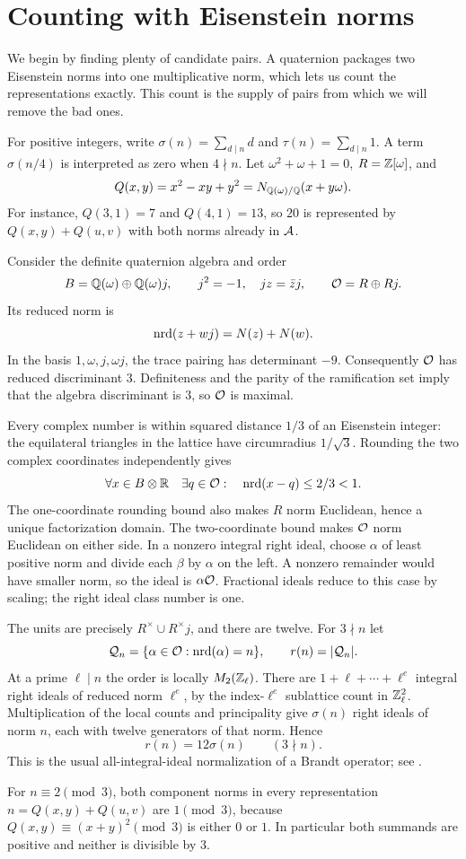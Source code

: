 \section{Counting with Eisenstein norms}\label{sec:norm}
We begin by finding plenty of candidate pairs. A quaternion packages two
Eisenstein norms into one multiplicative norm, which lets us count the
representations exactly. This count is the supply of pairs from which we
will remove the bad ones.

For positive integers, write $\sigma(n)=\sum_{d\mid n}d$ and
$\tau(n)=\sum_{d\mid n}1$. A term $\sigma(n/4)$ is interpreted as zero
when $4\nmid n$. Let $\omega^2+\omega+1=0$, $R=\Z[\omega]$, and
\[
Q(x,y)=x^2-xy+y^2=N_{\Q(\omega)/\Q}(x+y\omega).
\]
For instance, $Q(3,1)=7$ and $Q(4,1)=13$, so $20$ is represented by
$Q(x,y)+Q(u,v)$ with both norms already in $\AA$.

Consider the definite quaternion algebra and order
\[
B=\Q(\omega)\oplus\Q(\omega)j,\qquad
j^2=-1,\quad jz=\bar z j,\qquad \OO=R\oplus Rj.
\]
Its reduced norm is
\[
\nrd(z+w j)=N(z)+N(w).
\]
In the basis $1,\omega,j,\omega j$, the trace pairing has determinant $-9$.
Consequently $\OO$ has reduced discriminant $3$. Definiteness and the parity
of the ramification set imply that the algebra discriminant is $3$, so
$\OO$ is maximal.

Every complex number is within squared distance $1/3$ of an Eisenstein
integer: the equilateral triangles in the lattice have circumradius
$1/\sqrt3$. Rounding the two complex coordinates independently gives
\[
\forall x\in B\otimes\mathbb R\quad\exists q\in\OO:
\quad\nrd(x-q)\le2/3<1.
\]
The one-coordinate rounding bound also makes $R$ norm Euclidean, hence
a unique factorization domain. The two-coordinate bound makes $\OO$
norm Euclidean on either side. In a nonzero integral right
ideal, choose $\alpha$ of least positive norm and divide each $\beta$ by
$\alpha$ on the left. A nonzero remainder would have smaller norm, so the
ideal is $\alpha\OO$. Fractional ideals reduce to this case by scaling;
the right ideal class number is one.

The units are precisely $R^\times\cup R^\times j$, and there are twelve.
For $3\nmid n$ let
\[
\mathcal Q_n=\{\alpha\in\OO:\nrd(\alpha)=n\},\qquad r(n)=|\mathcal Q_n|.
\]
At a prime $\ell\mid n$ the order is locally $M_2(\Z_\ell)$. There are
$1+\ell+\cdots+\ell^e$ integral right ideals of reduced norm $\ell^e$,
by the index-$\ell^e$ sublattice count in $\Z_\ell^2$. Multiplication of
the local counts and principality give $\sigma(n)$ right ideals of norm
$n$, each with twelve generators of that norm. Hence
\begin{equation}\label{eq:count}
r(n)=12\sigma(n)\qquad(3\nmid n).
\end{equation}
This is the usual all-integral-ideal normalization of a Brandt operator;
see \cite[Proposition 41.3.1]{Voight}.

For $n\equiv2\pmod3$, both component norms in every representation
$n=Q(x,y)+Q(u,v)$ are $1\pmod3$, because
$Q(x,y)\equiv(x+y)^2\pmod3$ is either $0$ or $1$. In particular both
summands are positive and neither is divisible by $3$.
